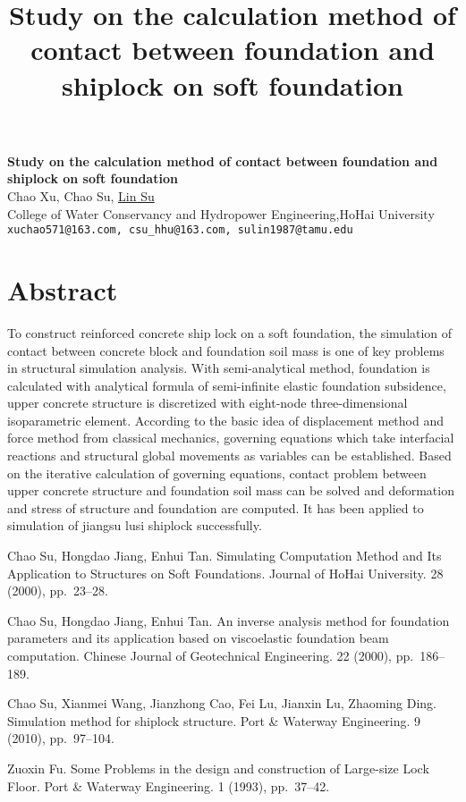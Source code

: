 \title{Study on the calculation method of contact between foundation and shiplock on soft foundation}
\author{} \institute{}

\begin{center}

\textbf{\Large Study on the calculation method of contact between foundation and shiplock on soft foundation}\\
\vspace{10mm}
{\large Chao Xu, Chao Su, \underline{Lin Su}}\\
College of Water Conservancy and Hydropower Engineering,HoHai University\\
{\tt xuchao571@163.com, csu\_hhu@163.com, sulin1987@tamu.edu}

\end{center}

\section*{Abstract}

To construct reinforced concrete ship lock on a soft foundation, the simulation of contact between concrete block and foundation soil mass is one of key problems in structural simulation analysis. With semi-analytical method, foundation is calculated with analytical formula of semi-infinite elastic foundation subsidence, upper concrete structure is discretized with eight-node three-dimensional isoparametric element. According to the basic idea of displacement method and force method from classical mechanics, governing equations which take interfacial reactions and structural global movements as variables can be established. Based on the iterative calculation of governing equations, contact problem between upper concrete structure and foundation soil mass can be solved and deformation and stress of structure and foundation are computed. It has been applied to simulation of jiangsu lusi shiplock successfully.


\begin{thebibliography}{10}

{\sc Chao Su, Hongdao Jiang, Enhui Tan}. {Simulating Computation Method and Its Application to Structures on Soft Foundations}. Journal of HoHai University. 28 (2000), pp.~23--28.

{\sc Chao Su, Hongdao Jiang, Enhui Tan}. {An inverse analysis method for foundation parameters and its application based on viscoelastic foundation beam computation}. Chinese Journal of Geotechnical Engineering. 22 (2000), pp.~186--189.

{\sc Chao Su, Xianmei Wang, Jianzhong Cao, Fei Lu, Jianxin Lu, Zhaoming Ding}. {Simulation method for shiplock structure}. Port \& Waterway Engineering. 9 (2010), pp.~97--104.

{\sc Zuoxin Fu}. {Some Problems in the design and construction of Large-size Lock Floor}. Port \& Waterway Engineering. 1 (1993), pp.~37--42.

\end{thebibliography}